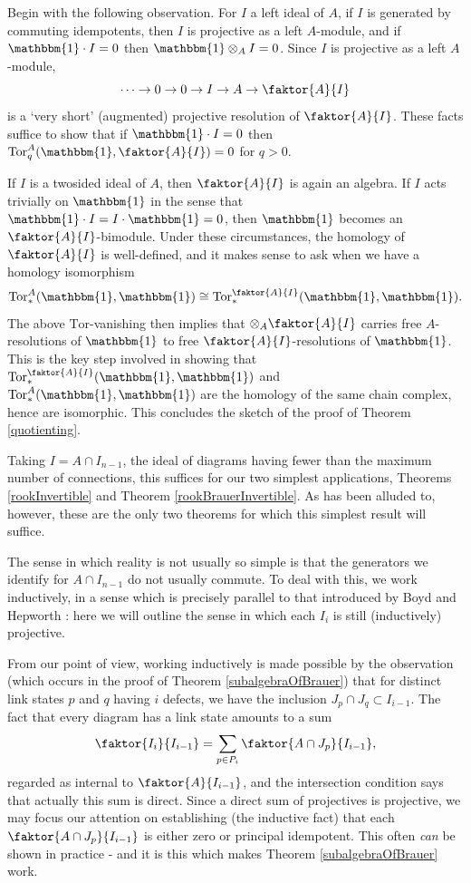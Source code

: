 \documentclass[12pt]{amsart}
\theoremstyle{plain}
\theoremstyle{definition} \newtheorem{definition}[theorem]{Definition}
\theoremstyle{plain}
\theoremstyle{plain} \newtheorem{proposition}[theorem]{Proposition}
\theoremstyle{plain} \newtheorem{conjecture}[theorem]{Conjecture}
\theoremstyle{plain} \newtheorem{corollary}[theorem]{Corollary}
\theoremstyle{remark} \newtheorem{claim}[theorem]{Claim}
\theoremstyle{remark} \newtheorem{remark}[theorem]{Remark}
\theoremstyle{remark} \newtheorem{example}[theorem]{Example}
\theoremstyle{remark} \newtheorem{comment}[theorem]{Comment}
\theoremstyle{definition} \newtheorem{question}[theorem]{Question}
\renewcommand{\t}{\mathbbm{1}}
\newcommand{\Tor}{\mathrm{Tor}}
\begin{document}
Begin with the following observation. For $I$ a left ideal of $A$, if $I$ is generated by commuting idempotents, then $I$ is projective as a left $A$-module, and if $\t \cdot I = 0$ then $\t \otimes_A I = 0$. Since $I$ is projective as a left $A$-module, $$\dots \to 0 \to 0 \to I \to A \to \faktor{A}{I}$$ is a `very short' (augmented) projective resolution of $\faktor{A}{I}$. These facts suffice to show that if $\t \cdot I = 0$ then $\Tor_q^A(\t, \faktor{A}{I})=0$ for $q>0$.

If $I$ is a twosided ideal of $A$, then $\faktor{A}{I}$ is again an algebra. If $I$ acts trivially on $\t$ in the sense that $\t \cdot I = I \cdot \t = 0$, then $\t$ becomes an $\faktor{A}{I}$-bimodule. Under these circumstances, the homology of $\faktor{A}{I}$ is well-defined, and it makes sense to ask when we have a homology isomorphism $$\Tor_*^A(\t,\t) \cong \Tor_*^{\faktor{A}{I}}(\t,\t).$$ The above $\Tor$-vanishing then implies that $\otimes_A \faktor{A}{I}$ carries free $A$-resolutions of $\t$ to free $\faktor{A}{I}$-resolutions of $\t$. This is the key step involved in showing that $\Tor_*^{\faktor{A}{I}}(\t,\t)$ and $\Tor_*^A(\t,\t)$ are the homology of the same chain complex, hence are isomorphic. This concludes the sketch of the proof of Theorem \ref{quotienting}.

Taking $I=A \cap I_{n-1}$, the ideal of diagrams having fewer than the maximum number of connections, this suffices for our two simplest applications, Theorems \ref{rookInvertible} and Theorem \ref{rookBrauerInvertible}. As has been alluded to, however, these are the only two theorems for which this simplest result will suffice.

The sense in which reality is not usually so simple is that the generators we identify for $A \cap I_{n-1}$ do not usually commute. To deal with this, we work inductively, in a sense which is precisely parallel to that introduced by Boyd and Hepworth \cite{BH}: here we will outline the sense in which each $I_i$ is still (inductively) projective.

From our point of view, working inductively is made possible by the observation (which occurs in the proof of Theorem \ref{subalgebraOfBrauer}) that for distinct link states $p$ and $q$ having $i$ defects, we have the inclusion $J_p \cap J_q \subset I_{i-1}$. The fact that every diagram has a link state amounts to a sum $$\faktor{I_i}{I_{i-1}} = \sum_{p \in P_i} \faktor{A \cap J_p}{I_{i-1}},$$ regarded as internal to $\faktor{A}{I_{i-1}}$, and the intersection condition says that actually this sum is direct. Since a direct sum of projectives is projective, we may focus our attention on establishing (the inductive fact) that each $\faktor{A \cap J_p}{I_{i-1}}$ is either zero or principal idempotent. This often \emph{can} be shown in practice - and it is this which makes Theorem \ref{subalgebraOfBrauer} work.
\end{document}
